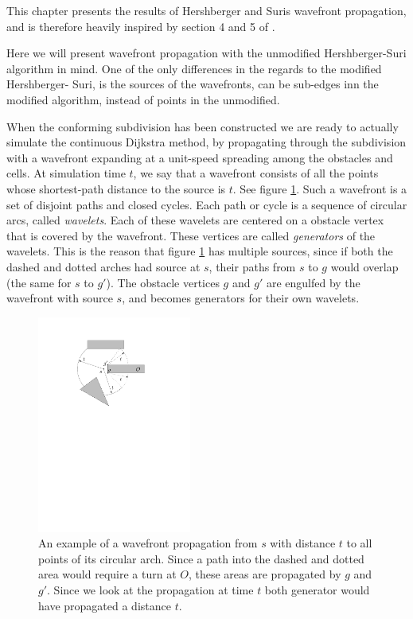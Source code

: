 \label{chapter:wavefrontpropagation}

This chapter presents the results of Hershberger and Suris wavefront propagation, 
and is therefore heavily inspired by section 4 and 5 of \cite{HershbergerS99}.

Here we will present wavefront propagation with the unmodified Hershberger-Suri 
algorithm in mind. One of the only differences in the regards to the modified Hershberger-
Suri, is the sources of the wavefronts, can be sub-edges inn the modified algorithm, 
instead of points in the unmodified.

When the conforming subdivision has been constructed we are ready to actually 
simulate the continuous Dijkstra method, by propagating through the subdivision with 
a wavefront expanding at a unit-speed spreading among the obstacles and cells. At simulation 
time $t$, we say that a wavefront consists of all the points whose shortest-path
distance to the source is $t$. See figure \ref{fig:wavefrontpropagation}. Such a 
wavefront is a set of disjoint paths and closed cycles. Each path or cycle is a 
sequence of circular arcs, called \textit{wavelets}. Each of these wavelets are 
centered on a obstacle vertex that is covered by the wavefront. These vertices 
are called \textit{generators} of the wavelets. This is the reason that figure 
\ref{fig:wavefrontpropagation} has multiple sources, since if both the dashed 
and dotted arches had source at $s$, their paths from $s$ to $g$ would overlap 
(the same for $s$ to $g'$). The obstacle vertices $g$ and $g'$ are engulfed by 
the wavefront with source $s$, and becomes generators for their own wavelets.

\begin{figure}
	\centering
	\includegraphics[width=0.45\textwidth]{figures/wavefrontpropagation.pdf}
	\caption{An example of a wavefront propagation from $s$ with distance $t$ to all
    		 points of its circular arch. Since a path into the dashed and dotted 
             area would require a turn at $O$, these areas are propagated 
             by $g$ and $g'$. Since we look at the propagation at time $t$ both 
             generator would have propagated a distance $t$.}
	\label{fig:wavefrontpropagation}
\end{figure}

